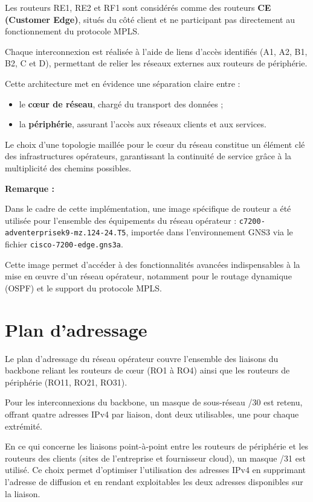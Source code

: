 \documentclass[12pt,a4paper, oneside]{memoir}
\begin{document}
Les routeurs RE1, RE2 et RF1 sont considérés comme des routeurs \textbf{CE (Customer Edge)}, situés du côté client et ne participant pas directement au fonctionnement du protocole MPLS.

Chaque interconnexion est réalisée à l’aide de liens d’accès identifiés (A1, A2, B1, B2, C et D), permettant de relier les réseaux externes aux routeurs de périphérie.

Cette architecture met en évidence une séparation claire entre :

\begin{itemize}
	\item le \textbf{cœur de réseau}, chargé du transport des données ;
	\item la \textbf{périphérie}, assurant l’accès aux réseaux clients et aux services.
\end{itemize}

Le choix d’une topologie maillée pour le cœur du réseau constitue un élément clé des infrastructures opérateurs, garantissant la continuité de service grâce à la multiplicité des chemins possibles.

\vspace{0.5cm}
\textbf{Remarque :}

Dans le cadre de cette implémentation, une image spécifique de routeur a été utilisée pour l’ensemble des équipements du réseau opérateur : \texttt{c7200-adventerprisek9-mz.124-24.T5}, importée dans l’environnement GNS3 via le fichier \texttt{cisco-7200-edge.gns3a}.

Cette image permet d’accéder à des fonctionnalités avancées indispensables à la mise en œuvre d’un réseau opérateur, notamment pour le routage dynamique (OSPF) et le support du protocole MPLS.


\section{Plan d’adressage}
Le plan d’adressage du réseau opérateur couvre l’ensemble des liaisons du backbone reliant les routeurs de cœur (RO1 à RO4) ainsi que les routeurs de périphérie (RO11, RO21, RO31).

Pour les interconnexions du backbone, un masque de sous-réseau /30 est retenu, offrant quatre adresses IPv4 par liaison, dont deux utilisables, une pour chaque extrémité.

En ce qui concerne les liaisons point-à-point entre les routeurs de périphérie et les routeurs des clients (sites de l’entreprise et fournisseur cloud), un masque /31 est utilisé. Ce choix permet d’optimiser l’utilisation des adresses IPv4 en supprimant l’adresse de diffusion et en rendant exploitables les deux adresses disponibles sur la liaison.
\end{document}
